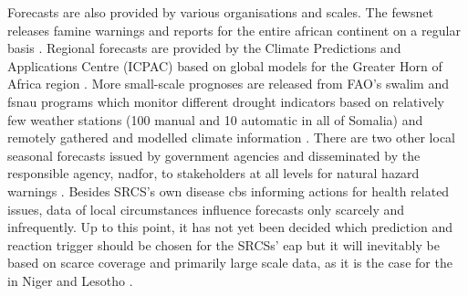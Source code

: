 Forecasts are also provided by various organisations and scales. The \acrshort{fewsnet} releases famine warnings and reports for the entire african continent on a regular basis \autocite{fewsnetFamineEarlyWarning2023}. Regional forecasts are provided by the Climate Predictions and Applications Centre (ICPAC) based on global models for the Greater Horn of Africa region \autocite{icpacDeliveringClimateServices2023}. More small-scale prognoses are released from FAO's \acrshort{swalim} and \acrshort{fsnau} programs which monitor different drought indicators based on relatively few weather stations (100 manual and 10 automatic in all of Somalia) and remotely gathered and modelled climate information \autocite{faoswalimSWALIMWeatherMonitoring2014,scrsFeasibilityStudyPotential2022}. There are two other local seasonal forecasts issued by government agencies and disseminated by the responsible agency, \acrshort{nadfor}, to stakeholders at all levels for natural hazard warnings \autocite{scrsFeasibilityStudyPotential2022}. Besides SRCS's own disease \acrshort{cbs} informing actions for health related issues, data of local circumstances influence forecasts only scarcely and infrequently.\newline
Up to this point, it has not yet been decided which prediction and reaction trigger should be chosen for the SRCSs' \acrshort{eap} but it will inevitably be based on scarce coverage and primarily large scale data, as it is the case for the  in Niger and Lesotho \autocite{lesothoredcrosssocietyEARLYACTIONPROTOCOL2022,nigerredcrosssocietyNigerDroughtEarly2021}.

